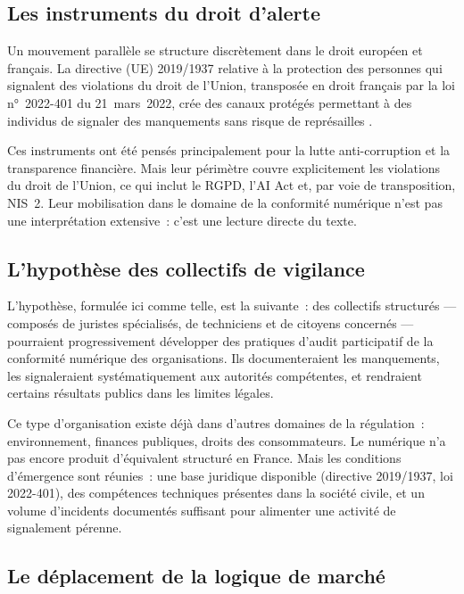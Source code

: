 \documentclass[12pt,a4paper]{article}
\begin{document}
\subsection{Les instruments du droit d'alerte}

Un mouvement parallèle se structure discrètement dans le droit européen et français. La directive (UE) 2019/1937 relative à la protection des personnes qui signalent des violations du droit de l'Union, transposée en droit français par la loi n°~2022-401 du 21~mars~2022, crée des canaux protégés permettant à des individus de signaler des manquements sans risque de représailles \parencite{directive20191937, loi2022401}.

Ces instruments ont été pensés principalement pour la lutte anti-corruption et la transparence financière. Mais leur périmètre couvre explicitement les violations du droit de l'Union, ce qui inclut le RGPD, l'AI Act et, par voie de transposition, NIS~2. Leur mobilisation dans le domaine de la conformité numérique n'est pas une interprétation extensive~: c'est une lecture directe du texte.

\subsection{L'hypothèse des collectifs de vigilance}

L'hypothèse, formulée ici comme telle, est la suivante~: des collectifs structurés --- composés de juristes spécialisés, de techniciens et de citoyens concernés --- pourraient progressivement développer des pratiques d'audit participatif de la conformité numérique des organisations. Ils documenteraient les manquements, les signaleraient systématiquement aux autorités compétentes, et rendraient certains résultats publics dans les limites légales.

Ce type d'organisation existe déjà dans d'autres domaines de la régulation~: environnement, finances publiques, droits des consommateurs. Le numérique n'a pas encore produit d'équivalent structuré en France. Mais les conditions d'émergence sont réunies~: une base juridique disponible (directive 2019/1937, loi 2022-401), des compétences techniques présentes dans la société civile, et un volume d'incidents documentés suffisant pour alimenter une activité de signalement pérenne.

\subsection{Le déplacement de la logique de marché}
\end{document}
